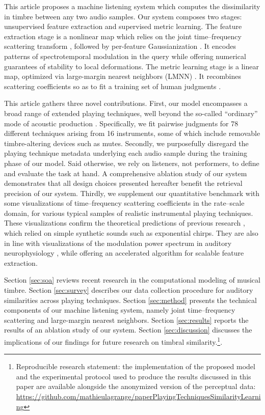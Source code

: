 \documentclass{bmcart}
\begin{document}
This article proposes a machine listening system which computes the dissimilarity in timbre between any two audio samples.
Our system composes two stages: unsupervised feature extraction and supervised metric learning.
The feature extraction stage is a nonlinear map which relies on the joint time--frequency scattering transform \cite{anden2015mlsp}, followed by per-feature Gaussianization \cite{lostanlen2018jasmp}.
It encodes patterns of spectrotemporal modulation in the query while offering numerical guarantees of stability to local deformations.
The metric learning stage is a linear map, optimized via large-margin nearest neighbors (LMNN) \cite{weinberger2009distance}.
It recombines scattering coefficients so as to fit a training set of human judgments \cite{mcadams1995psychres}.


This article gathers three novel contributions.
First, our model encompasses a broad range of extended playing techniques, well beyond the so-called ``ordinary'' mode of acoustic production \cite{lostanlen2018extended}.
Specifically, we fit pairwise judgments for 78 different techniques arising from 16 instruments, some of which include removable timbre-altering devices such as mutes.
Secondly, we purposefully disregard the playing technique metadata underlying each audio sample during the training phase of our model.
Said otherwise, we rely on listeners, not performers, to define and evaluate the task at hand.
A comprehensive ablation study of our system demonstrates that all design choices presented hereafter benefit the retrieval precision of our system.
Thirdly, we supplement our quantitative benchmark with some visualizations of time--frequency scattering coefficients in the rate--scale domain, for various typical samples of realistic instrumental playing techniques.
These visualizations confirm the theoretical predictions of previous research \cite{anden2015mlsp}, which relied on simple synthetic sounds such as exponential chirps.
They are also in line with visualizations of the modulation power spectrum in auditory neurophysiology \cite{patil2012ploscompbiol}, while offering an accelerated algorithm for scalable feature extraction.

Section \ref{sec:soa} reviews recent research in the computational modeling of musical timbre.
Section \ref{sec:survey} describes our data collection procedure for auditory similarities across playing techniques.
Section \ref{sec:method} presents the technical components of our machine listening system, namely joint time--frequency scattering and large-margin nearest neighbors.
Section \ref{sec:results} reports the results of an ablation study of our system.
Section \ref{sec:discussion} discusses the implications of our findings for future research on timbral similarity.\footnote{Reproducible research statement: the implementation of the proposed model and the experimental protocol used to produce the results discussed in this paper are available alongside the anonymized version of the perceptual data: \url{https://github.com/mathieulagrange/paperPlayingTechniquesSimilarityLearning}}.
\end{document}
